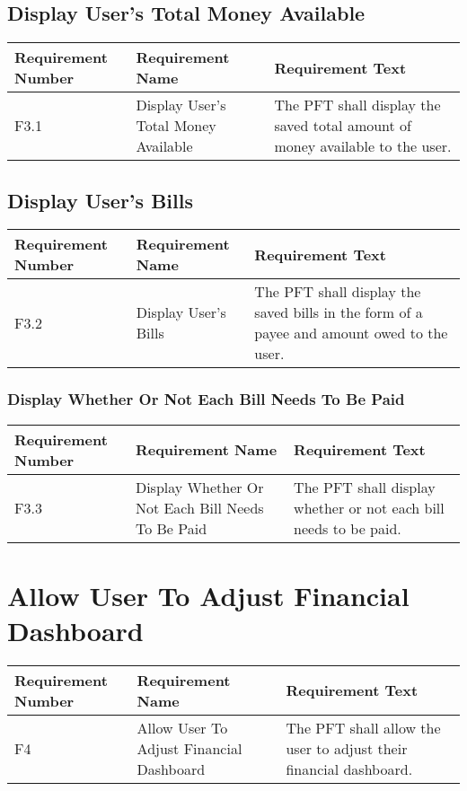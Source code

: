 \documentclass{article}
\begin{document}
\subsection{Display User's Total Money Available}

\begin{longtable}{|p{2cm}|p{6cm}| p{6cm}|}
    \hline
    \textbf{Requirement Number} & \textbf{Requirement Name} & \textbf{Requirement Text}\\
    \hline
    F3.1 & Display User's Total Money Available & The PFT shall display the saved total amount of money available to the user.  \\
    \hline
\end{longtable}

\subsection{Display User's Bills}

\begin{longtable}{|p{2cm}|p{6cm}| p{6cm}|}
    \hline
    \textbf{Requirement Number} & \textbf{Requirement Name} & \textbf{Requirement Text}\\
    \hline
    F3.2 & Display User's Bills & The PFT shall display the saved bills in the form of a payee and amount owed to the user.  \\
    \hline
\end{longtable}

\subsubsection{Display Whether Or Not Each Bill Needs To Be Paid}

\begin{longtable}{|p{2cm}|p{6cm}| p{6cm}|}
    \hline
    \textbf{Requirement Number} & \textbf{Requirement Name} & \textbf{Requirement Text}\\
    \hline
    F3.3 & Display Whether Or Not Each Bill Needs To Be Paid & The PFT shall display whether or not each bill needs to be paid.  \\
    \hline
\end{longtable}

\section{Allow User To Adjust Financial Dashboard}

\begin{longtable}{|p{2cm}|p{6cm}| p{6cm}|}
    \hline
    \textbf{Requirement Number} & \textbf{Requirement Name} & \textbf{Requirement Text}\\
    \hline
    F4 & Allow User To Adjust Financial Dashboard & The PFT shall allow the user to adjust their financial dashboard.  \\
    \hline
\end{longtable}
\end{document}
